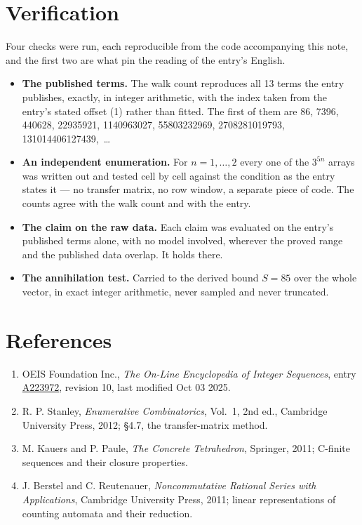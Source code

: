 \documentclass[11pt]{article}
\theoremstyle{definition}
\begin{document}
\section{Verification}

Four checks were run, each reproducible from the code accompanying this note, and the first two are what pin the reading of the entry's English.

\begin{itemize}

\item {\bfseries The published terms.} The walk count reproduces all 13 terms the entry publishes, exactly, in integer arithmetic, with the index taken from the entry's stated offset (1) rather than fitted. The first of them are 86, 7396, 440628, 22935921, 1140963027, 55803232969, 2708281019793, 131014406127439,~\dots

\item {\bfseries An independent enumeration.} For $n = 1,\dots,2$ every one of the $3^{5n}$ arrays was written out and tested cell by cell against the condition as the entry states it --- no transfer matrix, no row window, a separate piece of code. The counts agree with the walk count and with the entry.

\item {\bfseries The claim on the raw data.} Each claim was evaluated on the entry's published terms alone, with no model involved, wherever the proved range and the published data overlap. It holds there.

\item {\bfseries The annihilation test.} Carried to the derived bound $S = 85$ over the whole vector, in exact integer arithmetic, never sampled and never truncated.

\end{itemize}

\section{References}

\begin{enumerate}

\item OEIS Foundation Inc., \emph{The On-Line Encyclopedia of Integer Sequences}, entry \href{https://oeis.org/A223972}{A223972}, revision 10, last modified Oct 03 2025.

\item R. P. Stanley, \emph{Enumerative Combinatorics}, Vol.~1, 2nd ed., Cambridge University Press, 2012; \S4.7, the transfer-matrix method.

\item M. Kauers and P. Paule, \emph{The Concrete Tetrahedron}, Springer, 2011; C-finite sequences and their closure properties.

\item J. Berstel and C. Reutenauer, \emph{Noncommutative Rational Series with Applications}, Cambridge University Press, 2011; linear representations of counting automata and their reduction.

\end{enumerate}
\end{document}
